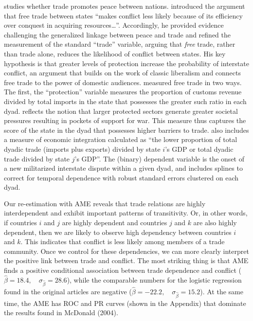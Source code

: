 \citet{mcdonald:2004} studies whether trade promotes peace between nations. \citet[p. 547]{mcdonald:2004} introduced the argument that free trade between states ``makes conflict less likely because of its efficiency over conquest in acquiring resources\ldots''. Accordingly, he provided evidence challenging the generalized linkage between peace and trade and refined the measurement of the standard ``trade'' variable, arguing that \textit{free} trade, rather than trade alone, reduces the likelihood of conflict between states. His key hypothesis is that greater levels of protection increase the probability of interstate conflict, an argument that builds on the work of classic liberalism and connects free trade to the power of domestic audiences. \citet{mcdonald:2004} measured free trade in two ways. The first, the ``protection'' variable measures the proportion of customs revenue divided by total imports in the state that possesses the greater such ratio in each dyad. reflects the notion that larger protected sectors generate greater societal pressures resulting in pockets of support for war. This measure thus captures the score of the state in the dyad that possesses higher barriers to trade. \citet[p. 560]{mcdonald:2004} also includes a measure of economic integration  calculated as ``the lower proportion of total dyadic trade (imports plus exports) divided by state $i$'s GDP or total dyadic trade divided by state $j$'s GDP''. The (binary) dependent variable is the onset of a new militarized interstate dispute within a given dyad, and \citet{mcdonald:2004} includes splines to correct for temporal dependence with robust standard errors clustered on each dyad.

Our re-estimation with AME reveals that trade relations are highly interdependent and exhibit important patterns of transitivity.  Or, in other words, if countries $i$ and $j$ are highly dependent and countries $j$ and $k$ are also highly dependent, then we are likely to observe high dependency between countries $i$ and $k$. This indicates that conflict is less likely among members of a trade community. Once we control for these dependencies, we can more clearly interpret the positive link between trade and conflict.  The most striking thing is that AME finds a positive conditional association between trade dependence and conflict ($\hat{\beta}= 18.4, \quad \sigma_{\hat{\beta}} = 28.6$), while the comparable numbers for the logistic regression found in the original articles are negative ($\hat{\beta}= -22.2, \quad \sigma_{\hat{\beta}} = 15.2$). At the same time, the AME has ROC and PR curves (shown in the Appendix) that dominate the results found in McDonald (2004).

